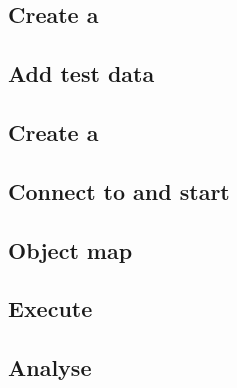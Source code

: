 

\subsection{Create a \gdcase{}}


\subsection{Add test data}


\subsection{Create a \gdsuite{}}
\label{tutorialCreateSuite}


\subsection{Connect to \gdserver and start \gdaut{}}
\label{tutorialAUT}


\subsection{Object map}
\label{tutorialOM}


\subsection{Execute}
\label{tutorialExecute}


\subsection{Analyse}

